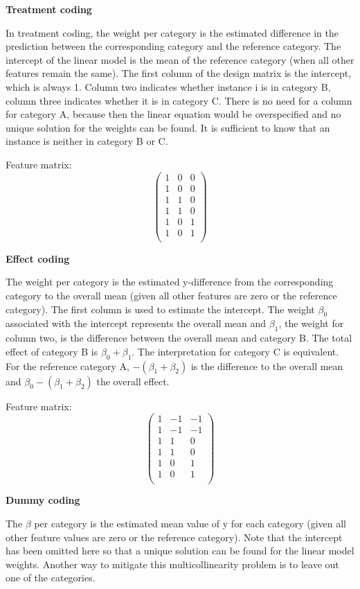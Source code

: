 \documentclass[
  11pt,
]{scrbook}
\begin{document}
\textbf{Treatment coding}

In treatment coding, the weight per category is the estimated difference in the prediction between the corresponding category and the reference category.
The intercept of the linear model is the mean of the reference category (when all other features remain the same).
The first column of the design matrix is the intercept, which is always 1.
Column two indicates whether instance i is in category B, column three indicates whether it is in category C.
There is no need for a column for category A, because then the linear equation would be overspecified and no unique solution for the weights can be found.
It is sufficient to know that an instance is neither in category B or C.

Feature matrix: \[\begin{pmatrix}1&0&0\\1&0&0\\1&1&0\\1&1&0\\1&0&1\\1&0&1\\\end{pmatrix}\]

\textbf{Effect coding}

The weight per category is the estimated y-difference from the corresponding category to the overall mean (given all other features are zero or the reference category).
The first column is used to estimate the intercept.
The weight \(\beta_{0}\) associated with the intercept represents the overall mean and \(\beta_{1}\), the weight for column two, is the difference between the overall mean and category B.
The total effect of category B is \(\beta_{0}+\beta_{1}\).
The interpretation for category C is equivalent.
For the reference category A, \(-(\beta_{1}+\beta_{2})\) is the difference to the overall mean and \(\beta_{0}-(\beta_{1}+\beta_{2})\) the overall effect.

Feature matrix: \[\begin{pmatrix}1&-1&-1\\1&-1&-1\\1&1&0\\1&1&0\\1&0&1\\1&0&1\\\end{pmatrix}\]

\textbf{Dummy coding}

The \(\beta\) per category is the estimated mean value of y for each category (given all other feature values are zero or the reference category).
Note that the intercept has been omitted here so that a unique solution can be found for the linear model weights.
Another way to mitigate this multicollinearity problem is to leave out one of the categories.
\end{document}
